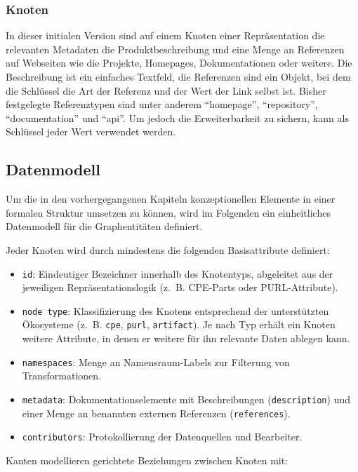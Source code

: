 \subsubsection{Knoten}

In dieser initialen Version sind auf einem Knoten einer Repräsentation die relevanten Metadaten die Produktbeschreibung und eine Menge an Referenzen auf Webseiten wie die Projekte, Homepages, Dokumentationen oder weitere.
Die Beschreibung ist ein einfaches Textfeld, die Referenzen sind ein Objekt, bei dem die Schlüssel die Art der Referenz und der Wert der Link selbst ist.
Bisher festgelegte Referenztypen sind unter anderem \enquote{homepage}, \enquote{repository}, \enquote{documentation} und \enquote{api}.
Um jedoch die Erweiterbarkeit zu sichern, kann als Schlüssel jeder Wert verwendet werden.

\subsection{Datenmodell}

Um die in den vorhergegangenen Kapiteln konzeptionellen Elemente in einer formalen Struktur umsetzen zu können, wird im Folgenden ein einheitliches Datenmodell für die Graphentitäten definiert.

Jeder Knoten wird durch mindestens die folgenden Basisattribute definiert:

\begin{itemize}
    \itemsep0em
    \item \texttt{id}: Eindeutiger Bezeichner innerhalb des Knotentyps, abgeleitet aus der jeweiligen Repräsentationslogik (z.\ B. CPE-Parts oder PURL-Attribute).
    \item \texttt{node type}: Klassifizierung des Knotens entsprechend der unterstützten Ökosysteme (z.\ B. \texttt{cpe}, \texttt{purl}, \texttt{artifact}).
    Je nach Typ erhält ein Knoten weitere Attribute, in denen er weitere für ihn relevante Daten ablegen kann.
    \item \texttt{namespaces}: Menge an Namensraum-Labels zur Filterung von Transformationen.
    \item \texttt{metadata}: Dokumentationselemente mit Beschreibungen (\texttt{description}) und einer Menge an benannten externen Referenzen (\texttt{references}).
    \item \texttt{contributors}: Protokollierung der Datenquellen und Bearbeiter.
\end{itemize}

Kanten modellieren gerichtete Beziehungen zwischen Knoten mit:

